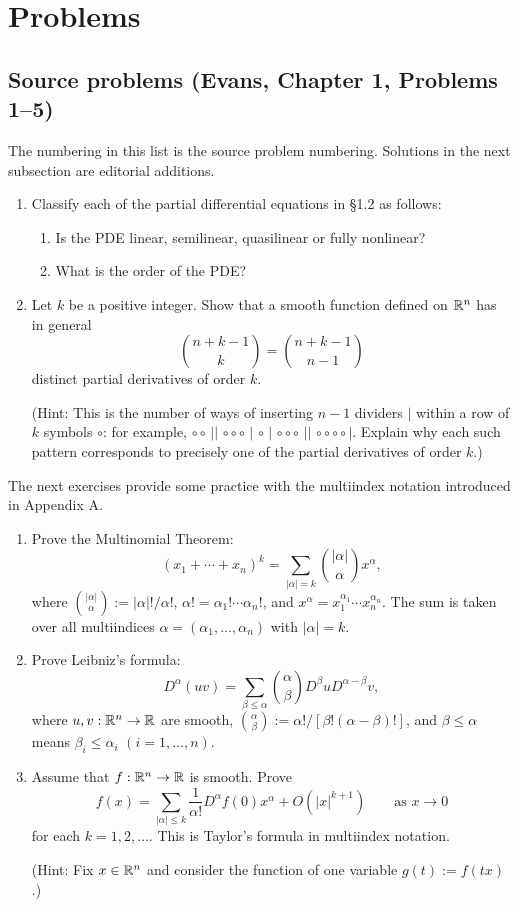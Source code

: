 \section{Problems}
\label{sec:1-5}

\subsection*{Source problems (Evans, Chapter 1, Problems 1--5)}
The numbering in this list is the source problem numbering. Solutions in
the next subsection are editorial additions.
\begin{enumerate}
\item Classify each of the partial differential equations in \S1.2 as follows:
\begin{enumerate}[label=(\alph*)]
\item Is the PDE linear, semilinear, quasilinear or fully nonlinear?
\item What is the order of the PDE?
\end{enumerate}
\item Let $k$ be a positive integer. Show that a smooth function defined on
$\mathbb{R}^n$ has in general
\[
 \binom{n+k-1}{k}=\binom{n+k-1}{n-1}
\]
distinct partial derivatives of order $k$.

(Hint: This is the number of ways of inserting $n-1$ dividers $|$ within a
row of $k$ symbols $\circ$: for example,
$\circ\circ\,||\,\circ\circ\circ\,|\,\circ\,|\,\circ\circ\circ\,||\,
\circ\circ\circ\circ\,|$.
Explain why each such pattern corresponds to precisely one of the partial
derivatives of order $k$.)
\end{enumerate}

The next exercises provide some practice with the multiindex notation
introduced in Appendix A.
\begin{enumerate}[resume]
\item Prove the Multinomial Theorem:
\[
 (x_1+\cdots+x_n)^k=\sum_{|\alpha|=k}\binom{|\alpha|}{\alpha}x^\alpha,
\]
where $\binom{|\alpha|}{\alpha}:=|\alpha|!/\alpha!$,
$\alpha!=\alpha_1!\cdots\alpha_n!$, and
$x^\alpha=x_1^{\alpha_1}\cdots x_n^{\alpha_n}$.
The sum is taken over all multiindices $\alpha=(\alpha_1,\ldots,\alpha_n)$
with $|\alpha|=k$.
\item Prove Leibniz's formula:
\[
 D^\alpha(uv)=\sum_{\beta\leq\alpha}\binom{\alpha}{\beta}
 D^\beta uD^{\alpha-\beta}v,
\]
where $u,v:\mathbb{R}^n\to\mathbb{R}$ are smooth,
$\binom{\alpha}{\beta}:=\alpha!/[\beta!(\alpha-\beta)!]$, and
$\beta\leq\alpha$ means $\beta_i\leq\alpha_i$ $(i=1,\ldots,n)$.
\item Assume that $f:\mathbb{R}^n\to\mathbb{R}$ is smooth. Prove
\[
 f(x)=\sum_{|\alpha|\leq k}\frac1{\alpha!}D^\alpha f(0)x^\alpha
 +O(|x|^{k+1})\qquad\text{as }x\to0
\]
for each $k=1,2,\ldots$. This is Taylor's formula in multiindex notation.

(Hint: Fix $x\in\mathbb{R}^n$ and consider the function of one variable
$g(t):=f(tx)$.)
\end{enumerate}

